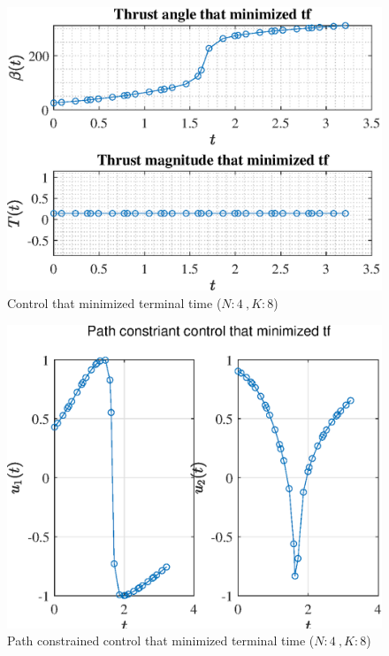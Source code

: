 \documentclass[]{article}
\begin{document}
	\begin{figure}
		\centering
		\includegraphics[scale=0.75]{control_N4_K8_C3_tf.eps}
		\caption{Control that minimized terminal time (\(N:4\ , K:8\))}
		\label{fig:control_N4_K8_C3_tf}
	\end{figure}
	\begin{figure}
		\centering
		\includegraphics[scale=0.75]{path_N4_K8_C3_tf.eps}
		\caption{Path constrained control that minimized terminal time (\(N:4\ , K:8\))}
		\label{fig:path_N4_K8_C3_tf}
	\end{figure}
\end{document}
